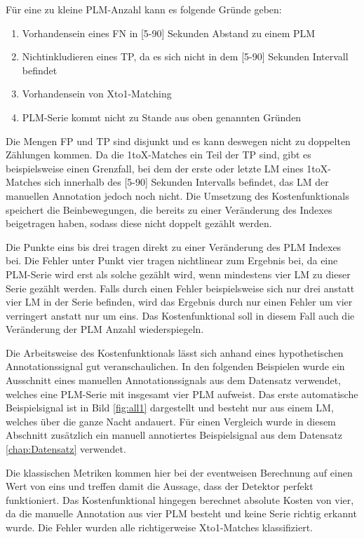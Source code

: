 \noindent Für eine zu kleine PLM-Anzahl kann es folgende Gründe geben:

\begin{enumerate}
	\item Vorhandensein eines FN in [5-90] Sekunden Abstand zu einem PLM
	\item Nichtinkludieren eines TP, da es sich nicht in dem [5-90] Sekunden Intervall befindet
	\item Vorhandensein von Xto1-Matching
	\item PLM-Serie kommt nicht zu Stande aus oben genannten Gründen
\end{enumerate}


Die Mengen FP und TP sind disjunkt und es kann deswegen nicht zu doppelten Zählungen kommen. Da die 1toX-Matches ein Teil der TP sind, gibt es beispielsweise einen Grenzfall, bei dem der erste oder letzte LM eines 1toX-Matches sich innerhalb des [5-90] Sekunden Intervalls befindet, das LM der manuellen Annotation jedoch noch nicht. Die Umsetzung des Kostenfunktionals speichert die Beinbewegungen, die bereits zu einer Veränderung des Indexes beigetragen haben, sodass diese nicht doppelt gezählt werden.
 
Die Punkte eins bis drei tragen direkt zu einer Veränderung des PLM Indexes bei. Die Fehler unter Punkt vier tragen nichtlinear zum Ergebnis bei, da eine PLM-Serie wird erst als solche gezählt wird, wenn mindestens vier LM zu dieser Serie gezählt werden. Falls durch einen Fehler beispielsweise sich nur drei anstatt vier LM in der Serie befinden, wird das Ergebnis durch nur einen Fehler um vier verringert anstatt nur um eins. Das Kostenfunktional soll in diesem Fall auch die Veränderung der PLM Anzahl wiederspiegeln. 


Die Arbeitsweise des Kostenfunktionals lässt sich anhand eines hypothetischen Annotationssignal gut veranschaulichen. In den folgenden Beispielen wurde ein Ausschnitt eines manuellen Annotationssignals aus dem Datensatz verwendet, welches eine PLM-Serie mit insgesamt vier PLM aufweist.  
Das erste automatische Beispielsignal ist in Bild \ref{fig:all1} dargestellt und besteht nur aus einem LM, welches über die ganze Nacht andauert. Für einen Vergleich wurde in diesem Abschnitt zusätzlich ein manuell annotiertes Beispielsignal aus dem Datensatz \ref{chap:Datensatz} verwendet.

Die klassischen Metriken kommen hier bei der eventweisen Berechnung auf einen Wert von eins und treffen damit die Aussage, dass der Detektor perfekt funktioniert. Das Kostenfunktional hingegen berechnet absolute Kosten von vier, da die manuelle Annotation aus vier PLM besteht und keine Serie richtig erkannt wurde. Die Fehler wurden alle richtigerweise Xto1-Matches klassifiziert. 


